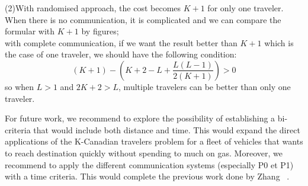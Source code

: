\documentclass[letter-size, 11pt]{article}
\begin{document}
(2)With randomised approach, the cost becomes $K+1$ for only one traveler. When there is no communication, it is complicated and we can compare the formular with $K+1$ by figures;
\\with complete communication, if we want the result better than $K+1$ which is the case of one traveler, we should have the following condition:
\[
(K+1)-(K+2-L+\frac{L(L-1)}{2(K+1)})>0
\]
so when $L>1$ and $2K+2>L$, multiple travelers can be better than only one traveler.

For future work, we recommend to explore the possibility of establishing a bi-criteria that would include both distance and time. This would expand the direct applications of the K-Canadian travelers problem for a fleet of vehicles that wants to reach destination quickly without spending to much on gas. 
Moreover, we recommend to apply the different communication systems (especially P0 et P1) with a time criteria. This would complete the previous work done by Zhang ~\cite{ZhXuQi11}.



\end{document}
